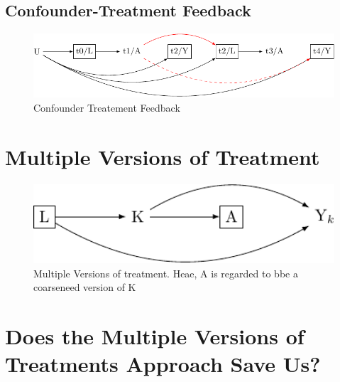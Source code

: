 \documentclass[
  singlecolumn]{report}
\begin{document}
\hypertarget{confounder-treatment-feedback}{%
\subsection{Confounder-Treatment
Feedback}\label{confounder-treatment-feedback}}

\begin{figure}

{\centering \includegraphics[width=1\textwidth,height=\textheight]{causal-dags_files/figure-pdf/fig-dag-9-1.pdf}

}

\caption{\label{fig-dag-9}Confounder Treatement Feedback}

\end{figure}

\hypertarget{multiple-versions-of-treatment}{%
\section{Multiple Versions of
Treatment}\label{multiple-versions-of-treatment}}

\begin{figure}

{\centering \includegraphics[width=1\textwidth,height=\textheight]{causal-dags_files/figure-pdf/fig_dag_multiple_version_treatment_dag-1.pdf}

}

\caption{Multiple Versions of treatment. Heae, A is regarded to bbe a
coarseneed version of K}

\end{figure}

\hypertarget{does-the-multiple-versions-of-treatments-approach-save-us}{%
\section{Does the Multiple Versions of Treatments Approach Save
Us?}\label{does-the-multiple-versions-of-treatments-approach-save-us}}
\end{document}
